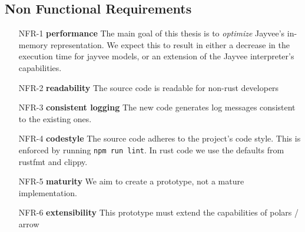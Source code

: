 %



\subsection{Non Functional Requirements}
\label{subsection:NonFunctionalRequirements}

\begin{enumerate}
	\item[NFR-1] \textbf{performance} The main goal of this thesis is to \emph{optimize} Jayvee's in-memory representation.
	      We expect this to result in either a decrease in the execution time for jayvee models, or an extension of the Jayvee interpreter's capabilities.
	\item[NFR-2] \textbf{readability} The source code is readable for non-rust developers
	\item[NFR-3] \textbf{consistent logging} The new code generates log messages consistent to the existing ones.
	\item[NFR-4] \textbf{codestyle} The source code adheres to the project's code style.
	      This is enforced by running \Verb|npm run lint|.
	      In rust code we use the defaults from rustfmt and clippy.
	\item[NFR-5] \textbf{maturity} We aim to create a prototype, not a mature implementation.
	\item[NFR-6] \textbf{extensibility} This prototype must extend the capabilities of polars / arrow %
\end{enumerate}

